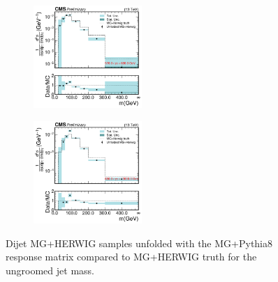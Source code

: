 \begin{figure}[htp!]
        \begin{subfigure}
          \centering
          \includegraphics[width=0.45\textwidth]{figures/multijet/unfolding/dijet/closure_herwig_binnedResult_ungroomed_3.pdf}
        \end{subfigure}
        \begin{subfigure}
          \centering
          \includegraphics[width=0.45\textwidth]{figures/multijet/unfolding/dijet/closure_herwig_binnedResult_ungroomed_4.pdf}
        \end{subfigure}
        \caption{Dijet MG+HERWIG samples unfolded with the MG+Pythia8 response matrix compared to MG+HERWIG truth for the ungroomed jet mass.}
	\label{fig:dijetherwigclosurebinned_u}
      \end{figure}


